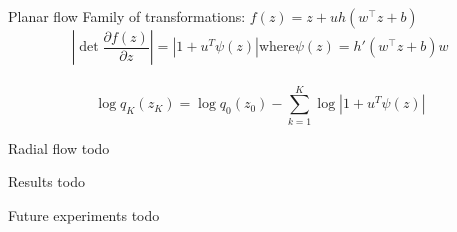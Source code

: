 \documentclass[unicode,11pt]{beamer}
\begin{document}
\begin{frame}[fragile]{Planar flow}
Family of transformations: $f(z) = z + uh(w^⊤z + b)$\\
\vspace{5mm}
$$\left\vert \det \frac{\partial f(z)}{\partial z} \right\vert = \left\vert 1 + u^T \psi(z) \right\vert \text{where} \psi(z) = h'(w^⊤z + b)w$$ \\
$$\log q_K(z_K) = \log q_0(z_0) − \sum_{k=1}^K \log \left\vert 1 + u^T \psi(z) \right\vert $$
\end{frame}

\begin{frame}[fragile]{Radial flow}
todo
\end{frame}


\begin{frame}[fragile]{Results}
todo
\end{frame}

\begin{frame}[fragile]{Future experiments}
todo 
\end{frame}
\end{document}
